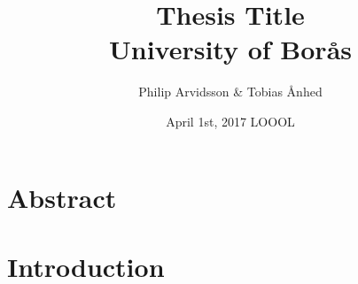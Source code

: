 \documentclass[12pt]{report}
\title{
  {Thesis Title}\\
  {\large University of Borås}\\
}
\author{Philip Arvidsson \& Tobias Ånhed}
\date{April 1st, 2017 LOOOL}
\begin{document}
    \maketitle

    \chapter*{Abstract}

    \tableofcontents
    \chapter{Introduction}
    
\end{document}
